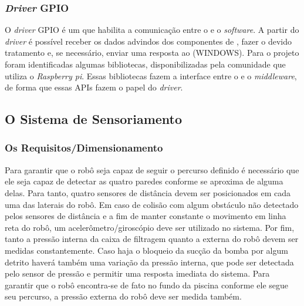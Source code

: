 \subsubsection{\textit{Driver} GPIO}
O \textit{driver} GPIO é um \software que habilita a comunicação entre o \hardware e o \textit{software}. A partir do \textit{driver} é possível receber  os dados advindos dos componentes de \hardware, fazer o devido tratamento e, se necessário, enviar uma resposta ao \hardware (WINDOWS). Para o projeto foram identificadas algumas bibliotecas, disponibilizadas pela comunidade que utiliza o \textit{Raspberry pi}. Essas bibliotecas fazem a interface entre o \hardware e o \textit{middleware}, de forma que essas \textsf{APIs} fazem o papel do \textit{driver}.

\subsection{O Sistema de Sensoriamento}
\subsubsection{Os Requisitos/Dimensionamento}
Para garantir que o robô seja capaz de seguir o percurso definido é necessário que ele seja capaz de detectar as quatro paredes conforme se aproxima de alguma delas. Para tanto, quatro sensores de distância devem ser posicionados em cada uma das laterais do robô. Em caso de colisão com algum obstáculo não detectado pelos sensores de distância e a fim de manter constante o movimento em linha reta do robô, um acelerômetro/giroscópio deve ser utilizado no sistema. Por fim, tanto a pressão interna da caixa de filtragem quanto a externa do robô devem ser medidas constantemente. Caso haja o bloqueio da sucção da bomba por algum detrito haverá também uma variação da pressão interna, que pode ser detectada pelo sensor de pressão e permitir uma resposta imediata do sistema. Para garantir que o robô encontra-se de fato no fundo da piscina conforme ele segue seu percurso, a pressão externa do robô deve ser medida também.

